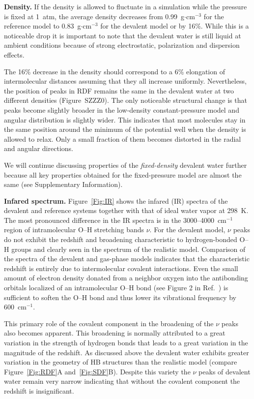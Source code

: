 \documentclass[aps,prl,reprint,amsmath,amssymb]{revtex4-1}
\begin{document}
\textbf{Density.} If the density is allowed to fluctuate in a simulation while the pressure is fixed at 1~atm, the average density decreases from 0.99~g$\cdot$cm$^{-3}$ for the reference model to 0.83~g$\cdot$cm$^{-3}$ for the devalent model or by 16\%. 
While this is a noticeable drop it is important to note that the devalent water is still liquid at ambient conditions because of strong electrostatic, polarization and dispersion effects. 

The 16\% decrease in the density should correspond to a 6\% elongation of intermolecular distances assuming that they all increase uniformly. Nevertheless, the position of peaks in RDF remains the same in the devalent water at two different densities (Figure~SZZZ0). The only noticeable structural change is that peaks become slightly broader in the low-density constant-pressure model and angular distribution is slightly wider. This indicates that most molecules stay in the same position around the minimum of the potential well when the density is allowed to relax. Only a small fraction of them becomes distorted in the radial and angular directions. 

We will continue discussing properties of the \emph{fixed-density} devalent water further because all key properties obtained for the fixed-pressure model are almost the same (see Supplementary Information).


\textbf{Infared spectrum.} Figure~\ref{Fig:IR} shows the infared (IR) spectra of the devalent and reference systems together with that of ideal water vapor at 298~K. 
The most pronounced difference in the IR spectra is in the 3000--4000~cm$^{-1}$ region of intramolecular O--H stretching bands $\nu$. 
For the devalent model, $\nu$ peaks do not exhibit the redshift and broadening characteristic to hydrogen-bonded O--H groups and clearly seen in the spectrum of the realistic model. 
Comparison of the spectra of the devalent and gas-phase models indicates that the characteristic redshift is entirely due to intermolecular covalent interactions. 
Even the small amount of electron density donated from a neighbor oxygen into the antibonding orbitals localized of an intramolecular O--H bond (see Figure 2 in Ref.~) is sufficient to soften the O--H bond and thus lower its vibrational frequency by 600~cm$^{-1}$.

This primary role of the covalent component in the broadening of the $\nu$ peaks also becomes apparent. 
This broadening is normally attributed to a great variation in the strength of hydrogen bonds that leads to a great variation in the magnitude of the redshift. 
As discussed above the devalent water exhibits greater variation in the geometry of HB structures than the realistic model (compare Figure~\ref{Fig:RDF}A and~\ref{Fig:SDF}B). 
Despite this variety the $\nu$ peaks of devalent water remain very narrow indicating that without the covalent component 
the redshift is insignificant. %
\end{document}
